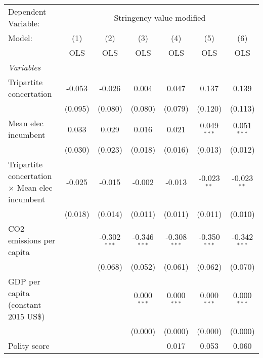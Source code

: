 
\begingroup
\centering
\begin{tabular}{lcccccc}
   \toprule
   Dependent Variable: & \multicolumn{6}{c}{Stringency value modified}\\
   Model:                                                & (1)     & (2)            & (3)            & (4)            & (5)            & (6)\\  
                                                         &  OLS    & OLS            & OLS            & OLS            & OLS            & OLS\\  
   \midrule
   \emph{Variables}\\
   Tripartite concertation                               & -0.053  & -0.026         & 0.004          & 0.047          & 0.137          & 0.139\\   
                                                         & (0.095) & (0.080)        & (0.080)        & (0.079)        & (0.120)        & (0.113)\\   
   Mean elec incumbent                                   & 0.033   & 0.029          & 0.016          & 0.021          & 0.049$^{***}$  & 0.051$^{***}$\\   
                                                         & (0.030) & (0.023)        & (0.018)        & (0.016)        & (0.013)        & (0.012)\\   
   Tripartite concertation $\times$ Mean elec incumbent  & -0.025  & -0.015         & -0.002         & -0.013         & -0.023$^{**}$  & -0.023$^{**}$\\   
                                                         & (0.018) & (0.014)        & (0.011)        & (0.011)        & (0.011)        & (0.010)\\   
   CO2 emissions per capita                              &         & -0.302$^{***}$ & -0.346$^{***}$ & -0.308$^{***}$ & -0.350$^{***}$ & -0.342$^{***}$\\   
                                                         &         & (0.068)        & (0.052)        & (0.061)        & (0.062)        & (0.070)\\   
   GDP per capita (constant 2015 US\$)                   &         &                & 0.000$^{***}$  & 0.000$^{***}$  & 0.000$^{***}$  & 0.000$^{***}$\\   
                                                         &         &                & (0.000)        & (0.000)        & (0.000)        & (0.000)\\   
   Polity score                                          &         &                &                & 0.017          & 0.053          & 0.060\\   

\end{tabular}
